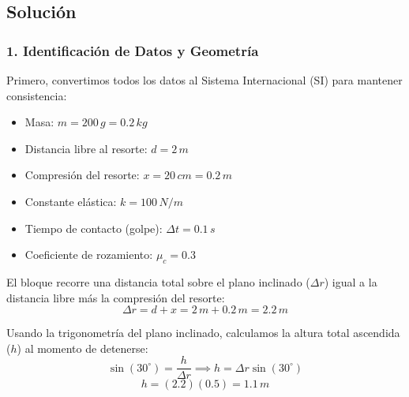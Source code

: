 \documentclass[12pt, a4paper]{article}
\begin{document}
\begin{center}
\end{center}

\subsection*{Solución}

\subsubsection*{1. Identificación de Datos y Geometría}
Primero, convertimos todos los datos al Sistema Internacional (SI) para mantener consistencia:
\begin{itemize}
    \item Masa: $m = 200 \, \si{g} = 0.2 \, \si{kg}$
    \item Distancia libre al resorte: $d = 2 \, \si{m}$
    \item Compresión del resorte: $x = 20 \, \si{cm} = 0.2 \, \si{m}$
    \item Constante elástica: $k = 100 \, \si{N/m}$
    \item Tiempo de contacto (golpe): $\Delta t = 0.1 \, \si{s}$
    \item Coeficiente de rozamiento: $\mu_c = 0.3$
\end{itemize}

El bloque recorre una distancia total sobre el plano inclinado ($\Delta r$) igual a la distancia libre más la compresión del resorte:
$$ \Delta r = d + x = 2 \, \si{m} + 0.2 \, \si{m} = 2.2 \, \si{m} $$

Usando la trigonometría del plano inclinado, calculamos la altura total ascendida ($h$) al momento de detenerse:
$$ \sin(30^\circ) = \frac{h}{\Delta r} \implies h = \Delta r \sin(30^\circ) $$
$$ h = (2.2)(0.5) = 1.1 \, \si{m} $$
\end{document}
